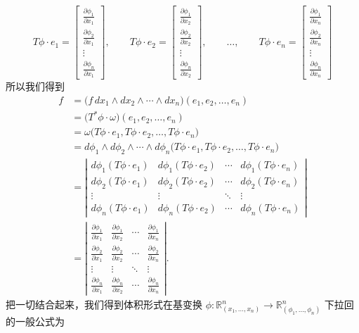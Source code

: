\[
T\phi\cdot e_1=\begin{bmatrix}\frac{\partial\phi_1}{\partial x_1}\\\frac{\partial\phi_2}{\partial x_1}\\\vdots\\\frac{\partial\phi_n}{\partial x_1}\end{bmatrix},\qquad
T\phi\cdot e_2=\begin{bmatrix}\frac{\partial\phi_1}{\partial x_2}\\\frac{\partial\phi_2}{\partial x_2}\\\vdots\\\frac{\partial\phi_n}{\partial x_2}\end{bmatrix},\qquad\ldots,\qquad
T\phi\cdot e_n=\begin{bmatrix}\frac{\partial\phi_1}{\partial x_n}\\\frac{\partial\phi_2}{\partial x_n}\\\vdots\\\frac{\partial\phi_n}{\partial x_n}\end{bmatrix}
\]
所以我们得到
\begin{align*}
f&=\bigl(f\,dx_1\wedge dx_2\wedge\cdots\wedge dx_n\bigr)(e_1,e_2,\ldots,e_n)\\
&=\bigl(T^*\phi\cdot\omega\bigr)(e_1,e_2,\ldots,e_n)\\
&=\omega\bigl(T\phi\cdot e_1,T\phi\cdot e_2,\ldots,T\phi\cdot e_n\bigr)\\
&=d\phi_1\wedge d\phi_2\wedge\cdots\wedge d\phi_n\bigl(T\phi\cdot e_1,T\phi\cdot e_2,\ldots,T\phi\cdot e_n\bigr)\\
&=\left|\begin{matrix}
d\phi_1(T\phi\cdot e_1)&d\phi_1(T\phi\cdot e_2)&\cdots&d\phi_1(T\phi\cdot e_n)\\
d\phi_2(T\phi\cdot e_1)&d\phi_2(T\phi\cdot e_2)&\cdots&d\phi_2(T\phi\cdot e_n)\\
\vdots&\vdots&\ddots&\vdots\\
d\phi_n(T\phi\cdot e_1)&d\phi_n(T\phi\cdot e_2)&\cdots&d\phi_n(T\phi\cdot e_n)
\end{matrix}\right|\\
&=\left|\begin{matrix}
\frac{\partial\phi_1}{\partial x_1}&\frac{\partial\phi_1}{\partial x_2}&\cdots&\frac{\partial\phi_1}{\partial x_n}\\
\frac{\partial\phi_2}{\partial x_1}&\frac{\partial\phi_2}{\partial x_2}&\cdots&\frac{\partial\phi_2}{\partial x_n}\\
\vdots&\vdots&\ddots&\vdots\\
\frac{\partial\phi_n}{\partial x_1}&\frac{\partial\phi_n}{\partial x_2}&\cdots&\frac{\partial\phi_n}{\partial x_n}
\end{matrix}\right|.
\end{align*}
把一切结合起来，我们得到体积形式在基变换 $\phi:\mathbb{R}^n_{(x_1,\ldots,x_n)}\to\mathbb{R}^n_{(\phi_1,\ldots,\phi_n)}$ 下拉回的一般公式为

